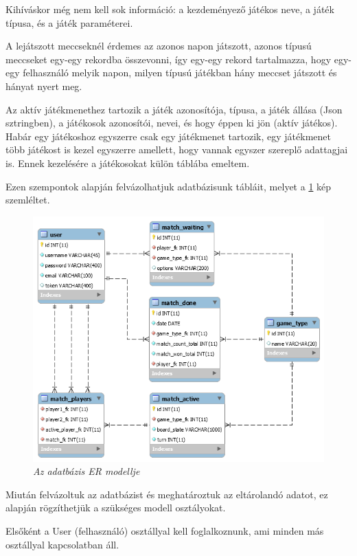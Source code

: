 Kihíváskor még nem kell sok információ: a kezdeményező játékos neve, a játék típusa, és a játék paraméterei.

A lejátszott meccseknél érdemes az azonos napon játszott, azonos típusú meccseket egy-egy rekordba összevonni, így egy-egy rekord tartalmazza, hogy egy-egy felhasználó melyik napon, milyen típusú játékban hány meccset játszott és hányat nyert meg.

Az aktív játékmenethez tartozik a játék azonosítója, típusa, a játék állása (Json sztringben), a játékosok azonosítói, nevei, és hogy éppen ki jön (aktív játékos). Habár egy játékoshoz egyszerre csak egy játékmenet tartozik, egy játékmenet több játékost is kezel egyszerre amellett, hogy vannak egyszer szereplő adattagjai is. Ennek kezelésére a játékosokat külön táblába emeltem.

Ezen szempontok alapján felvázolhatjuk adatbázisunk tábláit, melyet a \ref{fig:er-model} kép szemléltet.

\begin{figure}[!h]
	\centering
	\includegraphics[width=0.9\linewidth]{kepek/online-games-er.png}
	\caption{\textit{Az adatbázis ER modellje}}
	\label{fig:er-model}
\end{figure}



Miután felvázoltuk az adatbázist és meghatároztuk az eltárolandó adatot, ez alapján rögzíthetjük a szükséges modell osztályokat.

Elsőként a User (felhasználó) osztállyal kell foglalkoznunk, ami minden más osztállyal kapcsolatban áll.


